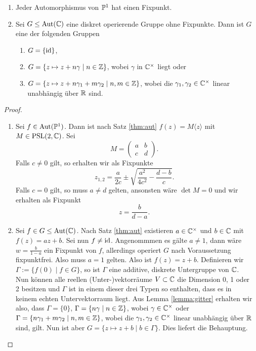 \begin{lemma}
  \label{lemma:deck-pc}
  \begin{enumerate}
  \item Jeder Automorphismus von $\P^1$ hat einen Fixpunkt.
  \item Sei $G \leq \Aut(\C)$ eine diskret operierende Gruppe ohne
    Fixpunkte. Dann ist $G$ eine der folgenden Gruppen
    \begin{enumerate}
    \item $G = \{\id\}$,
    \item $G = \{ z \mapsto z + n \gamma \mid n \in \Z\}$, wobei
      $\gamma$ in $\C^\times$ liegt oder
    \item $G = \{z \mapsto z + n \gamma_1 + m \gamma_2 \mid n,m \in
      \Z\}$, wobei die $\gamma_1, \gamma_2 \in \C^\times$ linear
      unabhängig über $\R$ sind.
    \end{enumerate}
  \end{enumerate}
\end{lemma}

\begin{proof}
  \begin{enumerate}
  \item Sei $f \in \Aut(\P^1)$. Dann ist nach Satz \ref{thm:aut} $f(z) = M\langle z \rangle$ mit $M
    \in \PSL(2, \C)$. Sei
    \[
    M =
    \begin{pmatrix}
      a & b \\
      c & d
    \end{pmatrix}.
    \]
    Falls $c \neq 0$ gilt, so erhalten wir als Fixpunkte
    \[
    z_{1,2} = \frac{a}{2c} \pm \sqrt{\frac{a^2}{4 c^2} - \frac{d-b}{c}}.
    \]
    Falls $c = 0$ gilt, so muss $a \neq d$ gelten, ansonsten wäre
    $\det M = 0$ und wir erhalten als Fixpunkt
    \[
    z = \frac{b}{d-a}.
    \]
  \item Sei $f \in G \leq \Aut(\C)$. Nach Satz \ref{thm:aut}
    existieren $a \in \C^\times$ und $b \in \C$ mit $f(z) = az
    +b$. Sei nun $f \neq \id$. Angenommmen es gälte $a \neq 1$, dann
    wäre $w = \frac{b}{1-a}$ ein Fixpunkt von $f$, allerdings operiert
    $G$ nach Voraussetzung fixpunktfrei. Also muss $a = 1$
    gelten. Also ist $f(z) = z + b$. Definieren wir $\Gamma := \{f(0) \mid
    f \in G\}$, so ist $\Gamma$ eine additive, diskrete Untergruppe
    von $\C$. Nun können alle reellen (Unter-)vektorräume $V \subset
    \C$ die Dimension 0, 1 oder 2 besitzen und $\Gamma$ ist in einem
    dieser drei Typen so enthalten, dass es in keinem echten
    Untervektorraum liegt. Aus Lemma \ref{lemma:gitter} erhalten wir
    also, dass $\Gamma = \{0\}$, $\Gamma = \{ n \gamma \mid n \in \Z\}$,
    wobei $\gamma \in \C^\times$ oder $\Gamma = \{n \gamma_1 + m
    \gamma_2 \mid n,m \in \Z \}$, wobei die $\gamma_1, \gamma_2 \in
    \C^\times$ linear unabhängig über $\R$ sind, gilt. Nun ist aber $G
    = \{z \mapsto z + b \mid b \in \Gamma \}$. Dies liefert die Behauptung.
  \end{enumerate}
\end{proof}

